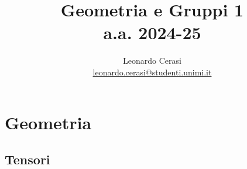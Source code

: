 \documentclass[]{book}
\author{Leonardo Cerasi \\ \small \href{mailto:leonardo.cerasi@studenti.unimi.it}{leonardo.cerasi@studenti.unimi.it}}
\title{\textbf{Geometria e Gruppi 1} \\ \Large a.a. 2024-25}
\date{}
\begin{document}
\maketitle
\tableofcontent

\part{Geometria}

\chapter{Tensori}

\end{document}
